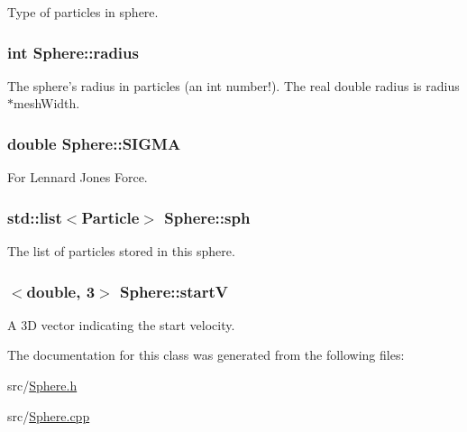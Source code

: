 Type of particles in sphere. \hypertarget{classSphere_ab4adc2969e56bb99f4a88fac7a390313}{
\subsubsection[{radius}]{\setlength{\rightskip}{0pt plus 5cm}int Sphere\-::radius\hspace{0.3cm}{\ttfamily [private]}}}\label{classSphere_ab4adc2969e56bb99f4a88fac7a390313}
The sphere's radius in particles (an int number!). The real double radius is radius$\ast$mesh\-Width. \hypertarget{classSphere_a1515a874e99244d9c4bc2bd782a4eb7f}{
\subsubsection[{S\-I\-G\-M\-A}]{\setlength{\rightskip}{0pt plus 5cm}double Sphere\-::\-S\-I\-G\-M\-A\hspace{0.3cm}{\ttfamily [private]}}}\label{classSphere_a1515a874e99244d9c4bc2bd782a4eb7f}
For Lennard Jones Force. \hypertarget{classSphere_a0f3aa4c3e86814bb8f7061dc83fc992c}{
\subsubsection[{sph}]{\setlength{\rightskip}{0pt plus 5cm}std\-::list$<${\bf Particle}$>$ Sphere\-::sph\hspace{0.3cm}{\ttfamily [private]}}}\label{classSphere_a0f3aa4c3e86814bb8f7061dc83fc992c}
The list of particles stored in this sphere. \hypertarget{classSphere_a93f232ff2747403c36fbe0513155da89}{
\subsubsection[{start\-V}]{$<$double, 3$>$ Sphere\-::start\-V\hspace{0.3cm}{\ttfamily [private]}}}\label{classSphere_a93f232ff2747403c36fbe0513155da89}
A 3\-D vector indicating the start velocity. 

The documentation for this class was generated from the following files\-:\begin{DoxyCompactItemize}
\item 
src/\hyperlink{Sphere_8h}{Sphere.\-h}\item 
src/\hyperlink{Sphere_8cpp}{Sphere.\-cpp}\end{DoxyCompactItemize}
